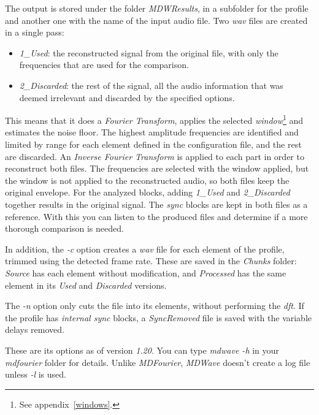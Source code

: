 \documentclass[10pt,a4paper]{report}
\newcommand{\ac}[1]{\textit{\mbox{\acrshort{#1}}}}
\begin{document}
\begin{appendices}
The output is stored under the folder \textit{MDWResults}, in a subfolder for the profile and another one with the name of the input audio file. Two \ac{wav} files are created in a single pass:

\begin{itemize}
	\item \textit{1\_Used}: the reconstructed signal from the original file, with only the frequencies that are used for the comparison.
	\item \textit{2\_Discarded}: the rest of the signal, all the audio information that was deemed irrelevant and discarded by the specified options.
\end{itemize}

This means that it does a \textit{Fourier Transform}, applies the selected \textit{window}\footnote{See appendix~\ref{windows}.} and estimates the noise floor. The highest amplitude frequencies are identified and limited by range for each element defined in the configuration file, and the rest are discarded. An \textit{Inverse Fourier Transform} is applied to each part in order to reconstruct both files. The frequencies are selected with the window applied, but the window is not applied to the reconstructed audio, so both files keep the original envelope. For the analyzed blocks, adding \textit{1\_Used} and \textit{2\_Discarded} together results in the original signal. The \textit{sync} blocks are kept in both files as a reference. With this you can listen to the produced files and determine if a more thorough comparison is needed.

In addition, the \textit{-c} option creates a \ac{wav} file for each element of the profile, trimmed using the detected frame rate. These are saved in the \textit{Chunks} folder: \textit{Source} has each element without modification, and \textit{Processed} has the same element in its \textit{Used} and \textit{Discarded} versions.

The \textit{-n} option only cuts the file into its elements, without performing the \ac{dft}. If the profile has \textit{internal sync} blocks, a \textit{SyncRemoved} file is saved with the variable delays removed.

These are its options as of version \textit{1.20}. You can type \textit{mdwave -h} in your \textit{mdfourier} folder for details. Unlike \textit{MDFourier}, \textit{MDWave} doesn't create a log file unless \textit{-l} is used.


\end{appendices}
\end{document}
